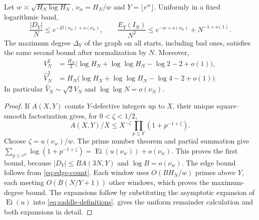\begin{proposition}\label{prop:cutoffs}
Let $w\asymp\sqrt{H_N\log H_N}$, $\nu_w=H_N/w$ and $Y=\lfloor e^w\rfloor$.
Uniformly in a fixed logarithmic band,
\begin{equation}\label{eq:free-cutoff}
 \frac{|D_Y|}{N}\le e^{-D(\nu_w)+o(\nu_w)},\qquad
 \frac{E_Y(I_N)}{N^2}\le e^{-w+o(\nu_w)}+N^{-1+o(1)}.
\end{equation}
The maximum degree $\Delta_Y$ of the graph on all starts, including bad
ones, satisfies the same second bound after normalization by $N$.
Moreover,
\begin{align}
 V_N^2&=\frac{H_N}{2}
       \bigl(\log H_N+\log\log H_N-\log2-2+o(1)\bigr),
       \label{eq:hard-expansion}\\
 \widehat V_N^2&=H_N
       \bigl(\log H_N+\log\log H_N-\log4-2+o(1)\bigr).
       \label{eq:soft-expansion}
\end{align}
In particular $\widehat V_N\sim\sqrt2 V_N$ and
$\log\log N=o(\nu_N)$.
\end{proposition}
\begin{proof}
If $A(X,Y)$ counts $Y$-defective integers up to $X$, their unique
square--smooth factorization gives, for $0<\zeta<1/2$,
\[
 A(X,Y)/X\le X^{-\zeta}\prod_{p\le Y}(1+p^{-1+\zeta}).
\]
Choose $\zeta=u(\nu_w)/w$. The prime number theorem and partial summation
give $\sum_{p\le e^w}\log(1+p^{-1+\zeta})
=\operatorname{Ei}(u(\nu_w))+o(\nu_w)$.
This proves the first bound, because $|D_Y|\le B A(3N,Y)$ and
$\log B=o(\nu_w)$. The edge bound follows from \eqref{eq:edge-count}.
Each window uses $O(BH_N/w)$ primes above $Y$, each meeting
$O(B(N/Y+1))$ other windows, which proves the maximum-degree bound.
The expansions follow by substituting the asymptotic expansion of
$\operatorname{Ei}(u)$ into \eqref{eq:saddle-definitions}.
 gives the uniform remainder calculation
and both expansions in detail.
\end{proof}


